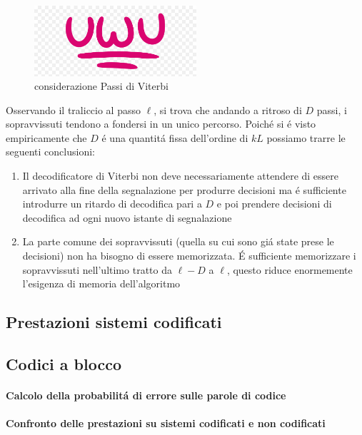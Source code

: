                 \begin{figure}[H]
                    \centering
                    \includegraphics[width = 6cm]{media/uwu.png}
                    \caption{considerazione Passi di Viterbi}
                \end{figure}
                Osservando il traliccio al passo $\ell$, si trova che andando a ritroso di $D$ passi, i sopravvissuti
                tendono a fondersi in un unico percorso. Poiché si é visto empiricamente che $D$ é una quantitá fissa
                dell'ordine di $kL$ possiamo trarre le seguenti conclusioni:
                \begin{enumerate}
                    \item {Il decodificatore di Viterbi non deve necessariamente attendere di essere arrivato
                        alla fine della segnalazione per produrre decisioni ma é sufficiente introdurre un ritardo di decodifica
                        pari a $D$ e poi prendere decisioni di decodifica ad ogni nuovo istante di segnalazione   
                    }
                    \item {La parte comune dei sopravvissuti (quella su cui sono giá state prese le decisioni)
                        non ha bisogno di essere memorizzata. É sufficiente memorizzare i sopravvissuti nell'ultimo tratto da 
                        $\ell -D$ a $\ell$, questo riduce enormemente l'esigenza di memoria dell'algoritmo
                    }
                \end{enumerate}
    \subsection{Prestazioni sistemi codificati}
        \subsection{Codici a blocco}
            \paragraph{Calcolo della probabilitá di errore sulle parole di codice}
            \paragraph{Confronto delle prestazioni su sistemi codificati e non codificati}
